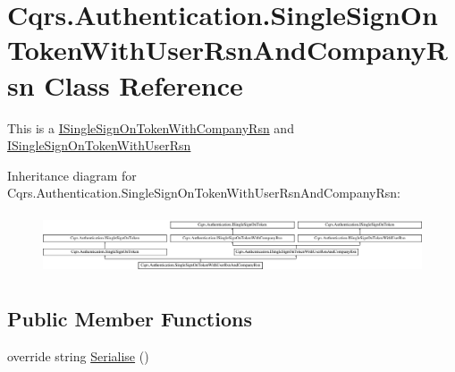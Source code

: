 \hypertarget{classCqrs_1_1Authentication_1_1SingleSignOnTokenWithUserRsnAndCompanyRsn}{}\section{Cqrs.\+Authentication.\+Single\+Sign\+On\+Token\+With\+User\+Rsn\+And\+Company\+Rsn Class Reference}
\label{classCqrs_1_1Authentication_1_1SingleSignOnTokenWithUserRsnAndCompanyRsn}


This is a \hyperlink{interfaceCqrs_1_1Authentication_1_1ISingleSignOnTokenWithCompanyRsn}{I\+Single\+Sign\+On\+Token\+With\+Company\+Rsn} and \hyperlink{interfaceCqrs_1_1Authentication_1_1ISingleSignOnTokenWithUserRsn}{I\+Single\+Sign\+On\+Token\+With\+User\+Rsn}  


Inheritance diagram for Cqrs.\+Authentication.\+Single\+Sign\+On\+Token\+With\+User\+Rsn\+And\+Company\+Rsn\+:\begin{figure}[H]
\begin{center}
\leavevmode
\includegraphics[height=1.794872cm]{classCqrs_1_1Authentication_1_1SingleSignOnTokenWithUserRsnAndCompanyRsn}
\end{center}
\end{figure}
\subsection*{Public Member Functions}
\begin{DoxyCompactItemize}
\item 
override string \hyperlink{classCqrs_1_1Authentication_1_1SingleSignOnTokenWithUserRsnAndCompanyRsn_a8d44249c00e5264dc7b37f4868836a80_a8d44249c00e5264dc7b37f4868836a80}{Serialise} ()
\end{DoxyCompactItemize}
